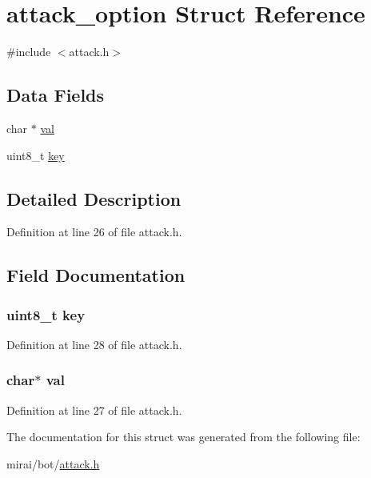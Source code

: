 \hypertarget{structattack__option}{}\section{attack\+\_\+option Struct Reference}
\label{structattack__option}


{\ttfamily \#include $<$attack.\+h$>$}

\subsection*{Data Fields}
\begin{DoxyCompactItemize}
\item 
char $\ast$ \hyperlink{structattack__option_a1d80a43cb41e5b550d4563dd10d302bc}{val}
\item 
uint8\+\_\+t \hyperlink{structattack__option_a3496dfc7a27df7eead65d48ed89e6867}{key}
\end{DoxyCompactItemize}


\subsection{Detailed Description}


Definition at line 26 of file attack.\+h.



\subsection{Field Documentation}
\subsubsection[{\texorpdfstring{key}{key}}]{\setlength{\rightskip}{0pt plus 5cm}uint8\+\_\+t key}\hypertarget{structattack__option_a3496dfc7a27df7eead65d48ed89e6867}{}\label{structattack__option_a3496dfc7a27df7eead65d48ed89e6867}


Definition at line 28 of file attack.\+h.

\subsubsection[{\texorpdfstring{val}{val}}]{\setlength{\rightskip}{0pt plus 5cm}char$\ast$ val}\hypertarget{structattack__option_a1d80a43cb41e5b550d4563dd10d302bc}{}\label{structattack__option_a1d80a43cb41e5b550d4563dd10d302bc}


Definition at line 27 of file attack.\+h.



The documentation for this struct was generated from the following file\+:\begin{DoxyCompactItemize}
\item 
mirai/bot/\hyperlink{attack_8h}{attack.\+h}\end{DoxyCompactItemize}

